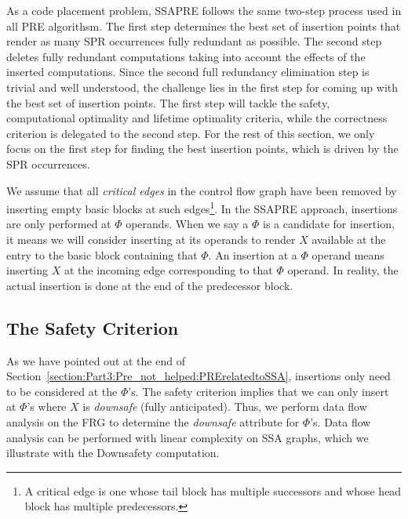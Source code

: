 As a code placement problem, SSAPRE follows the same two-step process used
in all PRE algorithsm.  The first step determines the best set of insertion 
points that render as many SPR occurrences fully redundant as possible.
The second step deletes fully redundant computations taking into account the
effects of the inserted computations.  Since the second full redundancy
elimination step is 
trivial and well understood, the challenge lies in the first step
for coming up with the best set of insertion points.  The first step will
tackle the safety, computational optimality and lifetime optimality criteria,
while the correctness criterion is delegated to the second step.
For the rest of this section, we only focus on the first step for
finding the best insertion points, which is driven by the SPR occurrences.

We assume that all \emph{critical edges}
in the control flow graph have been removed by inserting empty basic blocks
at such edges\footnote{A critical edge is one whose tail block has multiple
successors and whose head block has multiple predecessors.}\cite{Rosen88}.
In the SSAPRE approach, insertions are only performed at $\Phi$ operands.
When we say a $\Phi$ is a candidate for insertion, it means we will consider
inserting at its operands to render $X$ available at the entry to the basic
block containing that $\Phi$.  An insertion at a $\Phi$ operand means inserting
$X$ at the incoming edge corresponding to that $\Phi$ operand.  In reality,
the actual insertion is done at the end of the predecessor block.

\subsection{The Safety Criterion}

As we have pointed out at the end of 
Section~\ref{section:Part3:Pre_not_helped:PRErelatedtoSSA},
insertions only need to be considered at the $\Phi$'s.
The safety criterion implies that we can only insert at $\Phi$'s where $X$ 
is \emph{downsafe} (fully anticipated).  Thus, we perform data flow analysis on
the FRG to determine the \emph{downsafe} attribute for $\Phi$'s.
Data flow analysis can be performed with linear complexity on SSA graphs, which
we illustrate with the Downsafety computation.

